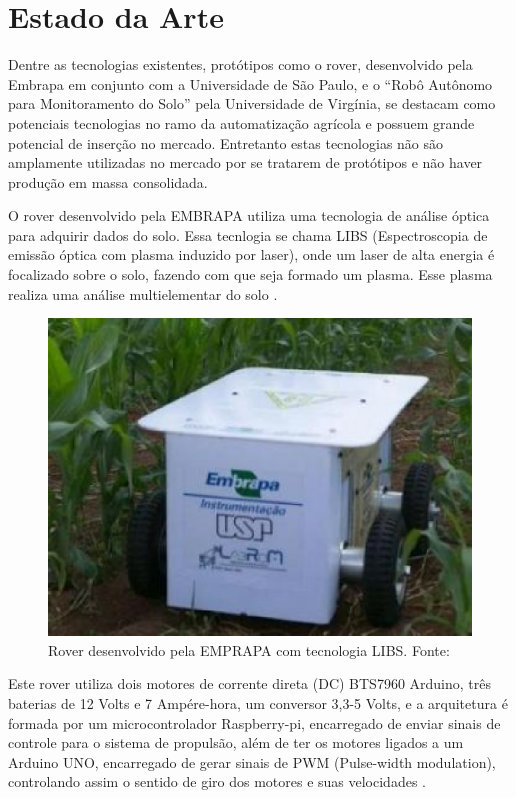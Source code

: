   \section{Estado da Arte}

  Dentre as tecnologias existentes, protótipos como o rover, desenvolvido pela
  Embrapa em conjunto com a Universidade de São Paulo, e o “Robô Autônomo para
  Monitoramento do Solo” pela Universidade de Virgínia, se destacam como
  potenciais tecnologias no ramo da automatização agrícola e possuem grande
  potencial de inserção no mercado.  Entretanto estas tecnologias não são
  amplamente utilizadas no mercado por se tratarem de protótipos e não haver
  produção em massa consolidada.

  O rover desenvolvido pela EMBRAPA utiliza uma tecnologia de análise óptica
  para adquirir dados do solo. Essa tecnlogia se chama LIBS (Espectroscopia de
  emissão óptica com plasma induzido por laser), onde um laser de alta energia
  é focalizado sobre o solo, fazendo com que seja formado um plasma.
  Esse plasma realiza uma análise multielementar do solo \cite{ARCHILA2014}.

  \begin{figure}[h]
    \centering
    \label{fig01}
      \includegraphics[keepaspectratio=true,scale=0.5]{figuras/fig02.eps}
    \caption{Rover desenvolvido pela EMPRAPA com tecnologia LIBS. Fonte: \cite{ARCHILA2014}}
  \end{figure}

  Este rover utiliza dois motores de corrente direta (DC) BTS7960 Arduino, três
  baterias de 12 Volts e 7 Ampére-hora, um conversor 3,3-5 Volts, e a arquitetura
  é formada por um microcontrolador Raspberry-pi, encarregado de enviar sinais
  de controle para o sistema de propulsão, além de ter os motores ligados a um
  Arduino UNO, encarregado de gerar sinais de PWM (Pulse-width modulation),
  controlando assim o sentido de giro dos motores e suas velocidades \cite{ARGOTE2014}.

